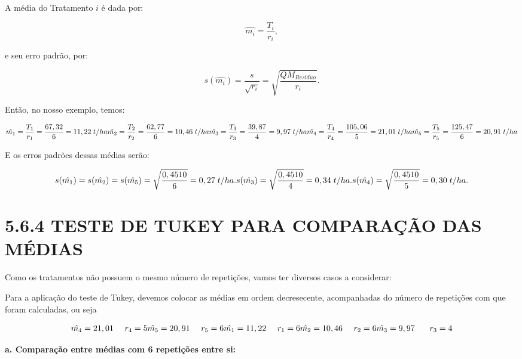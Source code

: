 \documentclass[
]{book}
\begin{document}
A média do Tratamento \(i\) é dada por:

\[
\hat{m_i} = \frac{T_i}{r_i},
\]

e seu erro padrão, por:

\[
s(\hat{m_i})=\frac{s}{\sqrt{r_i}} = \sqrt{\frac{QM_{Resíduo}}{r_i}}.
\]

Então, no nosso exemplo, temos:

\[
\hat{m_1} = \frac{T_1}{r_1}=\frac{67,32}{6}=11,22\;t/ha\\
\hat{m_2} = \frac{T_2}{r_2}=\frac{62,77}{6}=10,46\;t/ha\\
\hat{m_3} = \frac{T_3}{r_3}=\frac{39,87}{4}=9,97\;t/ha\\
\hat{m_4} = \frac{T_4}{r_4}=\frac{105,06}{5}=21,01\;t/ha\\
\hat{m_5} = \frac{T_5}{r_5}=\frac{125,47}{6}=20,91\;t/ha\\
\]

E os erros padrões dessas médias serão:

\[
s(\hat{m_1})=s(\hat{m_2})=s(\hat{m_5})=\sqrt{\frac{0,4510}{6}} = 0,27\;t/ha.\\
s(\hat{m_3})=\sqrt{\frac{0,4510}{4}} = 0,34\;t/ha.\\
s(\hat{m_4})=\sqrt{\frac{0,4510}{5}} = 0,30\;t/ha.
\]

\hypertarget{teste-de-tukey-para-comparauxe7uxe3o-das-muxe9dias}{%
\section{5.6.4 TESTE DE TUKEY PARA COMPARAÇÃO DAS MÉDIAS}\label{teste-de-tukey-para-comparauxe7uxe3o-das-muxe9dias}}

Como os tratamentos não possuem o mesmo número de repetições, vamos ter diversos casos a considerar:

Para a aplicação do teste de Tukey, devemos colocar as médias em ordem decresecente, acompanhadas do número de repetições com que foram calculadas, ou seja

\[
\hat{m_4}=21,01 \:\:\:\:\:\: r_4=5\\
\hat{m_5}=20,91 \:\:\:\:\:\: r_5=6\\
\hat{m_1}=11,22 \:\:\:\:\:\: r_1=6\\
\hat{m_2}=10,46 \:\:\:\:\:\: r_2=6\\
\hat{m_3}=9,97 \:\:\:\:\:\:\:\: r_3=4\\
\]

\textbf{a. Comparação entre médias com 6 repetições entre si:}
\end{document}
